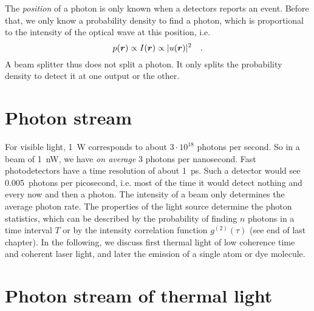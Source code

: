 The \emph{position} of a photon is only known when a detectors reports an event. Before that, we only know a probability density to find a photon, which is proportional to the intensity of the optical wave at this position, i.e.
\begin{equation}
    p(\boldsymbol{r}) \propto I(\boldsymbol{r})  \propto | u(\boldsymbol{r}) |^2 \quad .
\end{equation}
A beam splitter thus does not split a photon. It only splits the probability density to detect it at one output or the other.


\section{Photon stream}

For visible light, 1~W corresponds to about $3 \cdot 10^{18}$ photons per second. So in a beam of 1~nW, we have \emph{on average} 3 photons per nanosecond. Fast photodetectors have a time resolution of about 1~ps. Such a detector would see 0.005~photons per picosecond, i.e. most of the time it would detect nothing and every now and then a photon. The intensity of a beam only determines the average photon rate. The properties of the light source determine the photon statistics, which can be described by the probability of finding $n$ photons in a time interval $T$ or by the intensity correlation function $g^{(2)}(\tau)$ (see end of last chapter). In the following, we discuss first thermal light of low coherence time and coherent laser light, and later the emission of a single atom or dye molecule.

\section{Photon stream of thermal light}

